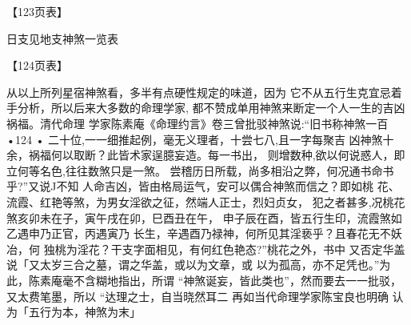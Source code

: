 【123页表】

日支见地支神煞一览表

【124页表】

从以上所列星宿神煞看，多半有点硬性规定的味道，因为
它不从五行生克宜忌着手分析，所以后来大多数的命理学家,
都不赞成单用神煞来断定一个人一生的吉凶祸福。清代命理
学家陈素庵《命理约言》卷三曾批驳神煞说:“旧书称神煞一百
•124 •
二十位,一一细推起例，毫无义理者，十尝七八,且一字每聚吉
凶神煞十余，祸福何以取断？此皆术家逞臆妄造。每一书出，
则增数种,欲以何说惑人，即立何等名色,往往数煞只是一煞。
尝稽历日所载，尚多相沿之弊，何况通书命书乎?”又说J不知
人命吉凶，皆由格局运气，安可以偶合神煞而信之？即如桃
花、流霞、红艳等煞，为男女淫欲之征，然端人正士，烈妇贞女，
犯之者甚多,况桃花煞亥卯未在子，寅午戌在卯，巳酉丑在午，
申子辰在酉，皆五行生印，流霞煞如乙遇申乃正官，丙遇寅乃
长生，辛遇酉乃禄神，何所见其淫亵乎？且春花无不妖冶，何
独桃为淫花？干支字面相见，有何红色艳态?”桃花之外，书中
又否定华盖说「又太岁三合之墓，谓之华盖，或以为文章，或
以为孤高，亦不足凭也。”为此，陈素庵毫不含糊地指出，所谓
“神煞诞妄，皆此类也”，然而要去一一批驳，又太费笔墨，所以
“达理之士，自当晓然耳二 再如当代命理学家陈宝良也明确
认为「五行为本，神煞为末」

